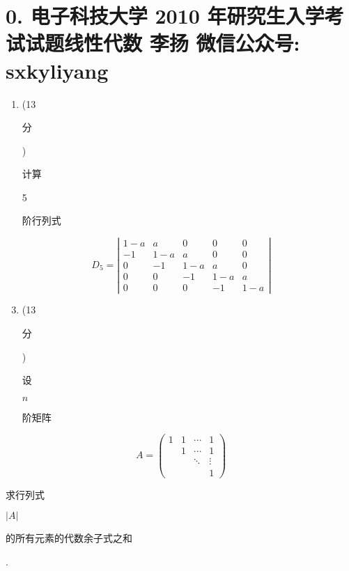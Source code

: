 \documentclass[10pt]{article}
\begin{document}
\section{0. 电子科技大学 2010 年研究生入学考试试题线性代数 
 李扬 
 微信公众号: sxkyliyang}
\begin{enumerate}
  \item (13 \begin{CJK}{UTF8}{mj}分\end{CJK}) \begin{CJK}{UTF8}{mj}计算\end{CJK} 5 \begin{CJK}{UTF8}{mj}阶行列式\end{CJK}
\end{enumerate}
$$
D_{5}=\left|\begin{array}{ccccc}
1-a & a & 0 & 0 & 0 \\
-1 & 1-a & a & 0 & 0 \\
0 & -1 & 1-a & a & 0 \\
0 & 0 & -1 & 1-a & a \\
0 & 0 & 0 & -1 & 1-a
\end{array}\right|
$$

\begin{enumerate}
  \setcounter{enumi}{2}
  \item (13 \begin{CJK}{UTF8}{mj}分\end{CJK}) \begin{CJK}{UTF8}{mj}设\end{CJK} $n$ \begin{CJK}{UTF8}{mj}阶矩阵\end{CJK}
\end{enumerate}
$$
A=\left(\begin{array}{cccc}
1 & 1 & \cdots & 1 \\
& 1 & \cdots & 1 \\
& & \ddots & \vdots \\
& & & 1
\end{array}\right)
$$
\begin{CJK}{UTF8}{mj}求行列式\end{CJK} $|A|$ \begin{CJK}{UTF8}{mj}的所有元素的代数余子式之和\end{CJK}.
\end{document}
